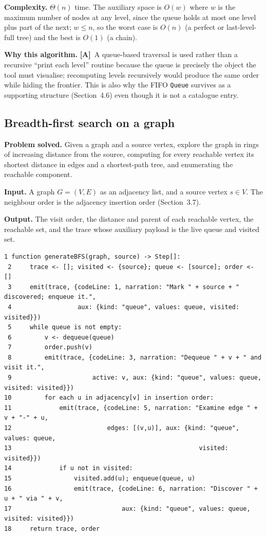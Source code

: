 \documentclass[11pt,a4paper]{article}
\newcommand{\A}{\textcolor{asmc}{\textbf{[A]}}}     %
\newcommand{\ct}[1]{\texttt{#1}}
\begin{document}
\smallskip
\noindent\textbf{Complexity.} $\Theta(n)$ time. The auxiliary space is $O(w)$ where $w$ is the
maximum number of nodes at any level, since the queue holds at most one level plus part of the
next; $w\le n$, so the worst case is $O(n)$ (a perfect or last-level-full tree) and the best is
$O(1)$ (a chain).

\smallskip
\noindent\textbf{Why this algorithm.} \A\ A queue-based traversal is used rather than a recursive
``print each level'' routine because the queue is precisely the object the tool must visualise;
recomputing levels recursively would produce the same order while hiding the frontier. This is
also why the FIFO \ct{Queue} survives as a supporting structure (Section~4.6) even though it is
not a catalogue entry.

\subsection{Breadth-first search on a graph}

\noindent\textbf{Problem solved.} Given a graph and a source vertex, explore the graph in rings of
increasing distance from the source, computing for every reachable vertex its shortest distance in
edges and a shortest-path tree, and enumerating the reachable component.

\smallskip
\noindent\textbf{Input.} A graph $G=(V,E)$ as an adjacency list, and a source vertex $s\in V$.
The neighbour order is the adjacency insertion order (Section~3.7).

\smallskip
\noindent\textbf{Output.} The visit order, the distance and parent of each reachable vertex, the
reachable set, and the trace whose auxiliary payload is the live queue and visited set.

\begin{lstlisting}[style=pseudo,caption={Instrumented breadth-first search. \ct{discover} and
\ct{examine} are separate steps so the frontier growth is visible.},label={lst:bfs}]
 1 function generateBFS(graph, source) -> Step[]:
 2     trace <- []; visited <- {source}; queue <- [source]; order <- []
 3     emit(trace, {codeLine: 1, narration: "Mark " + source + " discovered; enqueue it.",
 4                  aux: {kind: "queue", values: queue, visited: visited}})
 5     while queue is not empty:
 6         v <- dequeue(queue)
 7         order.push(v)
 8         emit(trace, {codeLine: 3, narration: "Dequeue " + v + " and visit it.",
 9                      active: v, aux: {kind: "queue", values: queue, visited: visited}})
10         for each u in adjacency[v] in insertion order:
11             emit(trace, {codeLine: 5, narration: "Examine edge " + v + "-" + u,
12                          edges: [(v,u)], aux: {kind: "queue", values: queue,
13                                                   visited: visited}})
14             if u not in visited:
15                 visited.add(u); enqueue(queue, u)
16                 emit(trace, {codeLine: 6, narration: "Discover " + u + " via " + v,
17                              aux: {kind: "queue", values: queue, visited: visited}})
18     return trace, order
\end{lstlisting}
\end{document}
